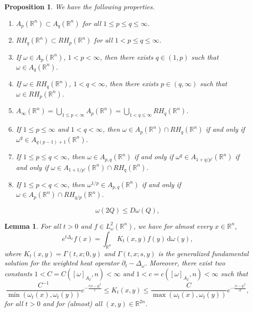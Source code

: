 \documentclass[10pt,a4paper]{amsart}
\newtheorem{prop}{Proposition}
\newtheorem{lem}{Lemma}
\begin{document}
\begin{prop}\label{prop:weights} We have the following properties.
    \begin{enumerate}
        \item $A_p(\mathbb{R}^n) \subset A_q(\mathbb{R}^n)$ for all $1 \leq p \leq q \leq \infty$.
        \item $RH_q(\mathbb{R}^n) \subset RH_p(\mathbb{R}^n)$ for all $1 < p \leq q \leq \infty$.
        \item If $\omega \in A_p(\mathbb{R}^n)$, $1<p<\infty$, then there exists $q \in (1,p)$ such that $\omega \in A_q(\mathbb{R}^n)$.
        \item If $\omega \in RH_q(\mathbb{R}^n)$, $1<q<\infty$, then there exists $p \in (q,\infty)$ such that $\omega \in RH_p(\mathbb{R}^n)$.
        \item $A_\infty(\mathbb{R}^n)= \bigcup_{1\le p<\infty} A_p(\mathbb{R}^n)= \bigcup_{1< q\le \infty} RH_q(\mathbb{R}^n) $.
        \item If $1\leq p \leq \infty$ and $1<q<\infty$, then $\omega \in A_p(\mathbb{R}^n) \cap RH_q(\mathbb{R}^n)$ if and only if $\omega^q \in A_{q(p-1)+1}(\mathbb{R}^n)$.
        \item If $1 \le p \le q < \infty$, then $\omega \in A_{p,q}(\mathbb{R}^n)$ if and only if $\omega^q \in A_{1+q/p'}(\mathbb{R}^n)$ if and only if $\omega \in A_{1+1/p'}(\mathbb{R}^n)\cap RH_q(\mathbb{R}^n)$.
        \item If $1 \le  p < q < \infty$, then $\omega^{1/p} \in A_{p,q}(\mathbb{R}^n)$ if and only if 
        $\omega \in A_p(\mathbb{R}^n) \cap RH_{q/p}(\mathbb{R}^n)$.
    \end{enumerate}
\end{prop}

\begin{equation}\label{DoublingMuck}
    \omega(2Q)\leq D \omega(Q),
\end{equation}

\begin{lem}\label{lem:GULB}
For all $t>0$ and $f \in L^2_\omega(\mathbb{R}^n)$, we have for almost every $x\in \mathbb{R}^n$,
    \begin{equation*}
        e^{t\Delta_\omega}f(x)= \int_{\mathbb{R}^n} K_t(x,y)f(y) \, \mathrm{d}\omega(y),
    \end{equation*}
    where $K_t(x,y)=\Gamma(t,x;0,y)$ and $\Gamma(t,x;s,y)$ is the generalized fundamental solution for the weighted heat operator $\partial_t-\Delta_\omega$. Moreover, there exist two constants $1<C=C([ \omega  ]_{A_2},n)<\infty$ and $1<c=c([ \omega  ]_{A_2},n)<\infty$ such that 
\begin{equation}\label{eq:GULB}
     \frac{C^{-1}}{\min(\omega_{t}(x),\omega_t(y))} e^{- \frac{c\left | x-y \right |^2}{t}} \leq 
     K_t(x,y) \leq \frac{C}{\max(\omega_{t}(x),\omega_t(y))} e^{- \frac{\left | x-y \right |^2}{ct}},
\end{equation}
for all $t>0$ and for (almost) all $(x,y) \in \mathbb{R}^{2n}$. 
\end{lem}
\end{document}
